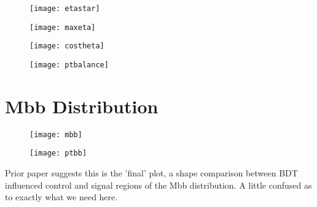 		\begin{figure}[h]
			\centering
			\begin{minipage}[h]{0.45\linewidth}
				\texttt{[image: etastar]}
				\caption{}
				\label{fig:bdtetastar}
			\end{minipage}
			\quad
			\begin{minipage}[h]{0.45\linewidth}
				\texttt{[image: maxeta]}
				\caption{}
				\label{fig:bdtmaxeta}
			\end{minipage}
		\end{figure}

		\begin{figure}[h]
			\centering
			\begin{minipage}[h]{0.45\linewidth}
				\texttt{[image: costheta]}
				\caption{}
				\label{fig:bdtcpostheta}
			\end{minipage}
			\quad
			\begin{minipage}[h]{0.45\linewidth}
				\texttt{[image: ptbalance]}
				\caption{}
				\label{fig:bdtptbalance}
			\end{minipage}
		\end{figure}


\section{Mbb Distribution}

		\begin{figure}[h]
			\centering
			\begin{minipage}[h]{0.45\linewidth}
				\texttt{[image: mbb]}
				\caption{}
				\label{fig:bdtmbb}
			\end{minipage}
			\quad
			\begin{minipage}[h]{0.45\linewidth}
				\texttt{[image: ptbb]}
				\caption{}
				\label{fig:bdtptbb}
			\end{minipage}
		\end{figure}

	Prior paper suggests this is the 'final' plot, a shape comparison between BDT influenced control and signal regions of the Mbb distribution. A little confused as to exactly what we need here.

\endinput
